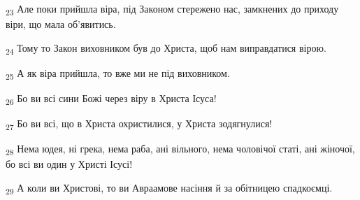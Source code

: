 \begin{tcolorbox}
\textsubscript{23} Але поки прийшла віра, під Законом стережено нас, замкнених до приходу віри, що мала об'явитись.
\end{tcolorbox}
\begin{tcolorbox}
\textsubscript{24} Тому то Закон виховником був до Христа, щоб нам виправдатися вірою.
\end{tcolorbox}
\begin{tcolorbox}
\textsubscript{25} А як віра прийшла, то вже ми не під виховником.
\end{tcolorbox}
\begin{tcolorbox}
\textsubscript{26} Бо ви всі сини Божі через віру в Христа Ісуса!
\end{tcolorbox}
\begin{tcolorbox}
\textsubscript{27} Бо ви всі, що в Христа охристилися, у Христа зодягнулися!
\end{tcolorbox}
\begin{tcolorbox}
\textsubscript{28} Нема юдея, ні грека, нема раба, ані вільного, нема чоловічої статі, ані жіночої, бо всі ви один у Христі Ісусі!
\end{tcolorbox}
\begin{tcolorbox}
\textsubscript{29} А коли ви Христові, то ви Авраамове насіння й за обітницею спадкоємці.
\end{tcolorbox}
